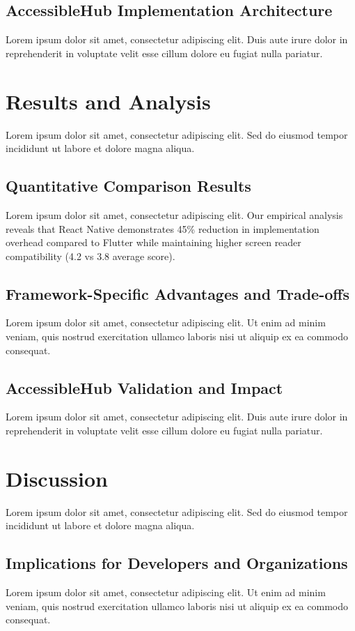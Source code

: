 \documentclass[sigconf]{acmart} %
\begin{document}
\subsection{AccessibleHub Implementation Architecture}
Lorem ipsum dolor sit amet, consectetur adipiscing elit. Duis aute irure dolor in reprehenderit in voluptate velit esse cillum dolore eu fugiat nulla pariatur.

\section{Results and Analysis}
\label{sec:results}

Lorem ipsum dolor sit amet, consectetur adipiscing elit. Sed do eiusmod tempor incididunt ut labore et dolore magna aliqua.

\subsection{Quantitative Comparison Results}
Lorem ipsum dolor sit amet, consectetur adipiscing elit. Our empirical analysis reveals that React Native demonstrates 45\% reduction in implementation overhead compared to Flutter while maintaining higher screen reader compatibility (4.2 vs 3.8 average score).

\subsection{Framework-Specific Advantages and Trade-offs}
Lorem ipsum dolor sit amet, consectetur adipiscing elit. Ut enim ad minim veniam, quis nostrud exercitation ullamco laboris nisi ut aliquip ex ea commodo consequat.

\subsection{AccessibleHub Validation and Impact}
Lorem ipsum dolor sit amet, consectetur adipiscing elit. Duis aute irure dolor in reprehenderit in voluptate velit esse cillum dolore eu fugiat nulla pariatur.

\section{Discussion}
\label{sec:discussion}

Lorem ipsum dolor sit amet, consectetur adipiscing elit. Sed do eiusmod tempor incididunt ut labore et dolore magna aliqua.

\subsection{Implications for Developers and Organizations}
Lorem ipsum dolor sit amet, consectetur adipiscing elit. Ut enim ad minim veniam, quis nostrud exercitation ullamco laboris nisi ut aliquip ex ea commodo consequat.
\end{document}
